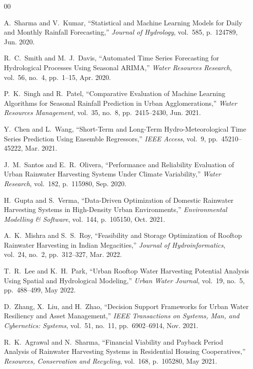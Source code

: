\documentclass[conference]{IEEEtran}
\begin{document}
\begin{thebibliography}{00}

A.~Sharma and V.~Kumar, ``Statistical and Machine Learning Models for Daily and Monthly Rainfall Forecasting,'' \textit{Journal of Hydrology}, vol.~585, p.~124789, Jun. 2020.

R.~C.~Smith and M.~J.~Davis, ``Automated Time Series Forecasting for Hydrological Processes Using Seasonal ARIMA,'' \textit{Water Resources Research}, vol.~56, no.~4, pp.~1--15, Apr. 2020.

P.~K.~Singh and R.~Patel, ``Comparative Evaluation of Machine Learning Algorithms for Seasonal Rainfall Prediction in Urban Agglomerations,'' \textit{Water Resources Management}, vol.~35, no.~8, pp.~2415--2430, Jun. 2021.

Y.~Chen and L.~Wang, ``Short-Term and Long-Term Hydro-Meteorological Time Series Prediction Using Ensemble Regressors,'' \textit{IEEE Access}, vol.~9, pp.~45210--45222, Mar. 2021.

J.~M.~Santos and E.~R.~Olivera, ``Performance and Reliability Evaluation of Urban Rainwater Harvesting Systems Under Climate Variability,'' \textit{Water Research}, vol.~182, p.~115980, Sep. 2020.

H.~Gupta and S.~Verma, ``Data-Driven Optimization of Domestic Rainwater Harvesting Systems in High-Density Urban Environments,'' \textit{Environmental Modelling \& Software}, vol.~144, p.~105150, Oct. 2021.

A.~K.~Mishra and S.~S.~Roy, ``Feasibility and Storage Optimization of Rooftop Rainwater Harvesting in Indian Megacities,'' \textit{Journal of Hydroinformatics}, vol.~24, no.~2, pp.~312--327, Mar. 2022.

T.~R.~Lee and K.~H.~Park, ``Urban Rooftop Water Harvesting Potential Analysis Using Spatial and Hydrological Modeling,'' \textit{Urban Water Journal}, vol.~19, no.~5, pp.~488--499, May 2022.

D.~Zhang, X.~Liu, and H.~Zhao, ``Decision Support Frameworks for Urban Water Resiliency and Asset Management,'' \textit{IEEE Transactions on Systems, Man, and Cybernetics: Systems}, vol.~51, no.~11, pp.~6902--6914, Nov. 2021.

R.~K.~Agrawal and N.~Sharma, ``Financial Viability and Payback Period Analysis of Rainwater Harvesting Systems in Residential Housing Cooperatives,'' \textit{Resources, Conservation and Recycling}, vol.~168, p.~105280, May 2021.


\end{thebibliography}
\end{document}
